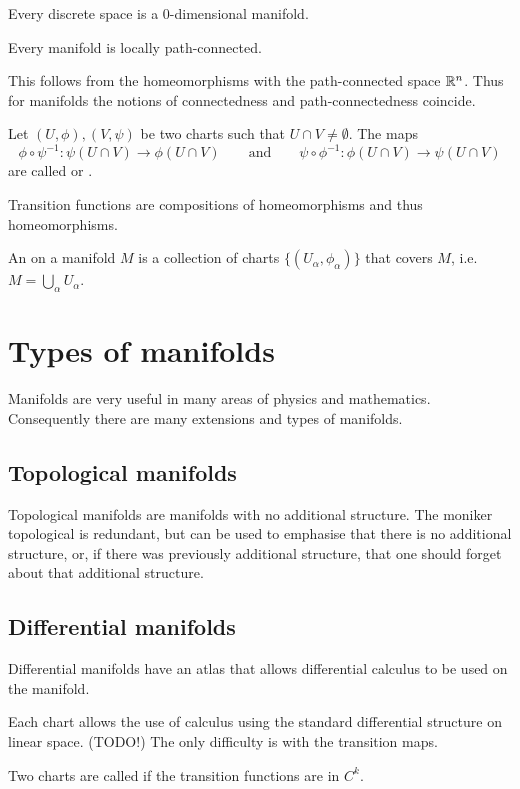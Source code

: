 \begin{proposition}
Every discrete space is a $0$-dimensional manifold.
\end{proposition}
\begin{lemma}
Every manifold is locally path-connected.
\end{lemma}
This follows from the homeomorphisms with the path-connected space $\mathbb{R}^n$. Thus for manifolds the notions of connectedness and path-connectedness coincide.

\begin{definition}
Let $(U,\phi), (V,\psi)$ be two charts such that $U\cap V \neq \emptyset$. The maps
\[ \phi\circ\psi^{-1}:\psi(U\cap V)\to \phi(U\cap V) \qquad \text{and} \qquad \psi\circ\phi^{-1}:\phi(U\cap V)\to \psi(U\cap V) \]
are called  or .
\end{definition}
Transition functions are compositions of homeomorphisms and thus homeomorphisms.

\begin{definition}
An  on a manifold $M$ is a collection of charts $\{(U_\alpha, \phi_\alpha)\}$ that covers $M$, i.e.\ $M=\bigcup_\alpha U_\alpha$.
\end{definition}

\section{Types of manifolds}
Manifolds are very useful in many areas of physics and mathematics. Consequently there are many extensions and types of manifolds.
\subsection{Topological manifolds}
Topological manifolds are manifolds with no additional structure. The moniker topological is redundant, but can be used to emphasise that there is no additional structure, or, if there was previously additional structure, that one should forget about that additional structure.
\subsection{Differential manifolds} 
Differential manifolds have an atlas that allows differential calculus to be used on the manifold.

Each chart allows the use of calculus using the standard differential structure on linear space. (TODO!) The only difficulty is with the transition maps.
\begin{definition}
Two charts are called  if the transition functions are in $C^k$.
\end{definition}

